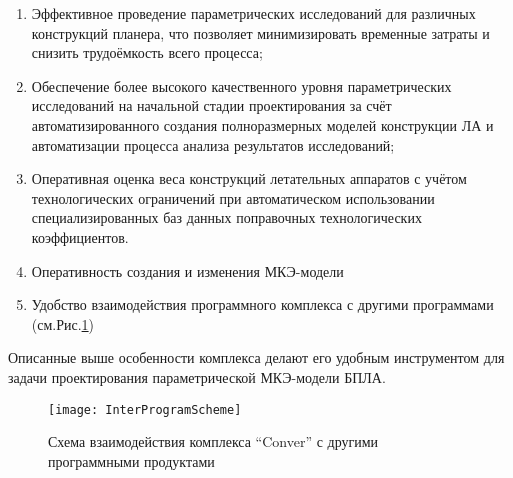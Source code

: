 \begin{enumerate}
\item Эффективное проведение параметрических исследований для различных конструкций планера, что позволяет минимизировать временные затраты и снизить трудоёмкость всего процесса;
\item Обеспечение более высокого качественного уровня параметрических исследований на начальной стадии проектирования за счёт автоматизированного создания полноразмерных моделей конструкции ЛА и автоматизации процесса анализа результатов исследований;
\item Оперативная оценка веса конструкций летательных аппаратов с учётом технологических ограничений при автоматическом использовании специализированных баз данных поправочных технологических коэффициентов.
\item Оперативность создания и изменения МКЭ-модели
\item Удобство взаимодействия программного комплекса с другими программами (см.Рис.\ref{fig:InterProgramScheme})
\end{enumerate}

Описанные выше особенности комплекса делают его удобным инструментом для задачи проектирования параметрической МКЭ-модели БПЛА. 

\begin{figure}
\centering
\def\svgwidth{0.8\textwidth}
%
\texttt{[image: InterProgramScheme]}
\caption{Схема взаимодействия комплекса ``Conver'' с другими программными продуктами}
\label{fig:InterProgramScheme}
\end{figure}


%